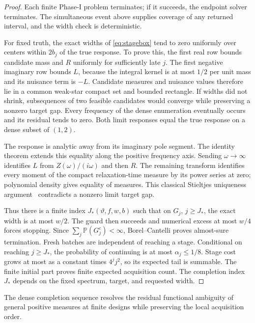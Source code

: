 \documentclass[10pt]{amsart}
\theoremstyle{definition}
\theoremstyle{remark}
\theoremstyle{plain}
\newcommand{\Prob}{\mathbb P}
\begin{document}
\begin{proof}
Each finite Phase-I problem terminates; if it succeeds, the endpoint solver terminates. The simultaneous event above supplies coverage of any returned interval, and the width check is deterministic.

For fixed truth, the exact widths of \eqref{eq:stagebox} tend to zero uniformly over centers within $2b_j$ of the true response. To prove this, the first real row bounds candidate mass and $R$ uniformly for sufficiently late $j$. The first negative imaginary row bounds $L$, because the integral kernel is at most $1/2$ per unit mass and its nuisance term is $-L$. Candidate measures and nuisance values therefore lie in a common weak-star compact set and bounded rectangle. If widths did not shrink, subsequences of two feasible candidates would converge while preserving a nonzero target gap. Every frequency of the dense enumeration eventually occurs and its residual tends to zero. Both limit responses equal the true response on a dense subset of $(1,2)$.

The response is analytic away from its imaginary pole segment. The identity theorem extends this equality along the positive frequency axis. Sending $\omega\to\infty$ identifies $L$ from $Z(\omega)/(i\omega)$ and then $R$. The remaining transform identifies every moment of the compact relaxation-time measure by its power series at zero; polynomial density gives equality of measures. This classical Stieltjes uniqueness argument~\cite{grabovsky} contradicts a nonzero limit target gap.

Thus there is a finite index $J_*(\vartheta,f,w,b)$ such that on $G_j$, $j\ge J_*$, the exact width is at most $w/2$. The guard then succeeds and numerical excess at most $w/4$ forces stopping. Since $\sum_j\Prob(G_j^c)<\infty$, Borel--Cantelli proves almost-sure termination. Fresh batches are independent of reaching a stage. Conditional on reaching $j\ge J_*$, the probability of continuing is at most $\alpha_j\le1/8$. Stage cost grows at most as a constant times $4^jj^2$, so its expected tail is summable. The finite initial part proves finite expected acquisition count. The completion index $J_*$ depends on the fixed spectrum, target, and requested width.
\end{proof}

The dense completion sequence resolves the residual functional ambiguity of general positive measures at finite designs while preserving the local acquisition order.
\end{document}
